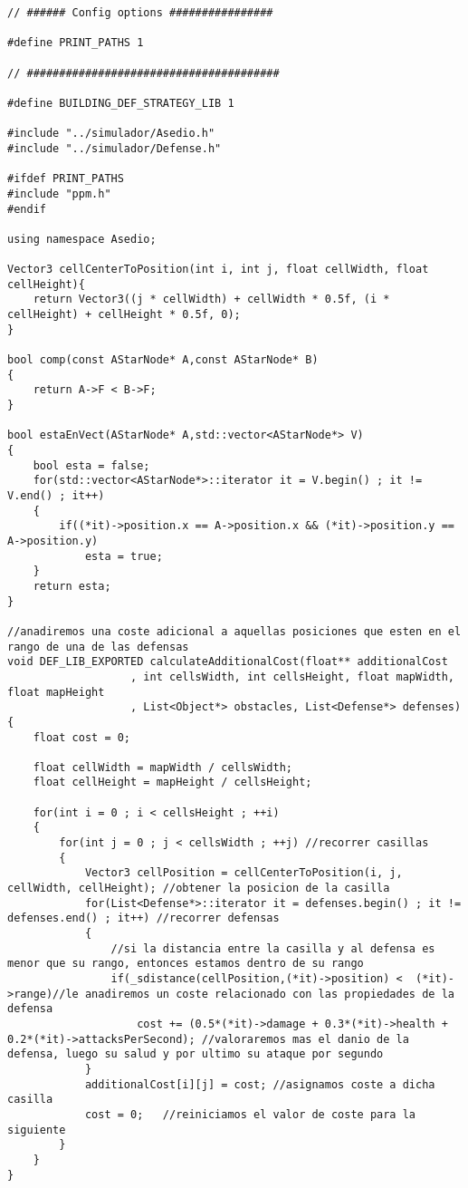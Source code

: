 \begin{lstlisting}[frame=single,basicstyle=\tiny,title={Algoritmo De Encontrar el Camino}]
// ###### Config options ################

#define PRINT_PATHS 1

// #######################################

#define BUILDING_DEF_STRATEGY_LIB 1
               
#include "../simulador/Asedio.h"
#include "../simulador/Defense.h"

#ifdef PRINT_PATHS
#include "ppm.h"
#endif

using namespace Asedio;

Vector3 cellCenterToPosition(int i, int j, float cellWidth, float cellHeight){ 
    return Vector3((j * cellWidth) + cellWidth * 0.5f, (i * cellHeight) + cellHeight * 0.5f, 0); 
}

bool comp(const AStarNode* A,const AStarNode* B)
{
	return A->F < B->F;
}

bool estaEnVect(AStarNode* A,std::vector<AStarNode*> V)
{
	bool esta = false;
	for(std::vector<AStarNode*>::iterator it = V.begin() ; it != V.end() ; it++)
	{	
		if((*it)->position.x == A->position.x && (*it)->position.y == A->position.y)
			esta = true;
	}
	return esta;
}

//anadiremos una coste adicional a aquellas posiciones que esten en el rango de una de las defensas
void DEF_LIB_EXPORTED calculateAdditionalCost(float** additionalCost
                   , int cellsWidth, int cellsHeight, float mapWidth, float mapHeight
                   , List<Object*> obstacles, List<Defense*> defenses) 
{
	float cost = 0;
	
    float cellWidth = mapWidth / cellsWidth;
    float cellHeight = mapHeight / cellsHeight;

    for(int i = 0 ; i < cellsHeight ; ++i) 
    {
        for(int j = 0 ; j < cellsWidth ; ++j) //recorrer casillas
        {
            Vector3 cellPosition = cellCenterToPosition(i, j, cellWidth, cellHeight); //obtener la posicion de la casilla
			for(List<Defense*>::iterator it = defenses.begin() ; it != defenses.end() ; it++) //recorrer defensas
			{
				//si la distancia entre la casilla y al defensa es menor que su rango, entonces estamos dentro de su rango
				if(_sdistance(cellPosition,(*it)->position) <  (*it)->range)//le anadiremos un coste relacionado con las propiedades de la defensa
					cost += (0.5*(*it)->damage + 0.3*(*it)->health + 0.2*(*it)->attacksPerSecond); //valoraremos mas el danio de la defensa, luego su salud y por ultimo su ataque por segundo
			}
			additionalCost[i][j] = cost; //asignamos coste a dicha casilla
			cost = 0;	//reiniciamos el valor de coste para la siguiente
        }
    }
}


\end{lstlisting}
